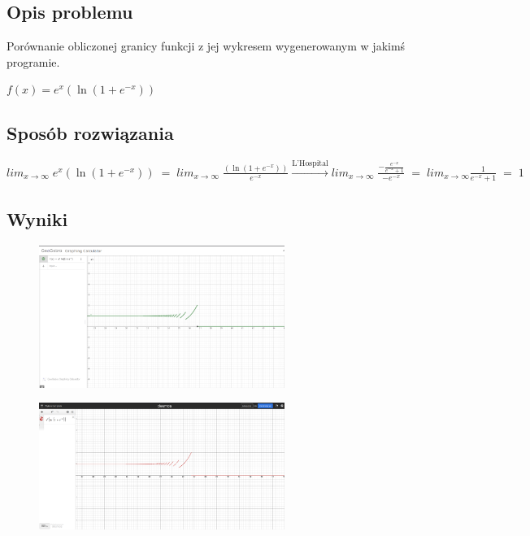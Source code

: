 \documentclass[12pt]{article}
\begin{document}
\subsection{Opis problemu}
Porównanie obliczonej granicy funkcji z jej wykresem wygenerowanym w jakimś 
programie.
\begin{center}
$f(x) = e^{x}(\ln(1 + e^{-x}))$\\

\end{center}


\subsection{Sposób rozwiązania}
$lim_{x\rightarrow \infty}\; e^{x}(\ln(1 + e^{-x}))\;=\;
lim_{x\rightarrow \infty}\; \frac{(\ln(1 + e^{-x}))}{e^{-x}}
\xrightarrow[\text{}]{\text{L'Hospital}} lim_{x\rightarrow \infty}\;\frac{-\frac{e^{-x}}{e^{-x}+1}}{-e^{-x}}
\;=\;lim_{x\rightarrow \infty}\frac{1}{e^{-x}+1}\;=\;1$

\subsection{Wyniki}
\begin{figure}[htp]
  \centering
  \includegraphics[width=8cm]{geo.png}
\end{figure}
\begin{figure}[htp]
  \centering
  \includegraphics[width=8cm]{desm.png}
\end{figure}
\end{document}
